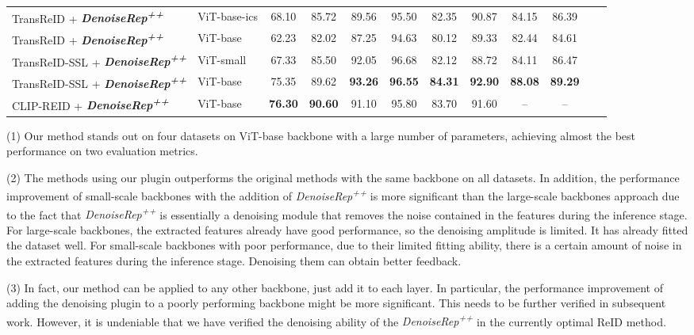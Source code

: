 \documentclass[conference]{IEEEtran}
\begin{document}
{\begin{table}[ht!]
\begin{tabular}{llcccccccccc}
\midrule
TransReID + \textbf{\textit{DenoiseRep\textsuperscript{++}}} & ViT-base-ics        & 68.10  & 85.72   & 89.56   & 95.50  & 82.35  & 90.87 & 84.15 & 86.39 \\ 
TransReID + \textbf{\textit{DenoiseRep\textsuperscript{++}}} & ViT-base        & 62.23  & 82.02   & 87.25   & 94.63  & 80.12  & 89.33 & 82.44 & 84.61  \\
TransReID-SSL + \textbf{\textit{DenoiseRep\textsuperscript{++}}} & ViT-small        &  67.33  & 85.50   & 92.05   & 96.68  & 82.12  & 88.72 & 84.11 & 86.47  \\ 
TransReID-SSL + \textbf{\textit{DenoiseRep\textsuperscript{++}}} & ViT-base        & 75.35  & 89.62   & \textbf{93.26}   & \textbf{96.55}  & \textbf{84.31}  & \textbf{92.90} & \textbf{88.08} & \textbf{89.29}  \\ 
CLIP-REID + \textbf{\textit{DenoiseRep\textsuperscript{++}}} &  ViT-base   & \textbf{76.30}  & \textbf{90.60}  & 91.10 &95.80  & 83.70 &91.60 & -- & --   \\
\hline \hline
\end{tabular}
\end{table}

(1) Our method stands out on four datasets on ViT-base backbone with a large number of parameters, achieving almost the best performance on two evaluation metrics.

(2) The methods using our plugin outperforms the original methods with the same backbone on all datasets. In addition, the performance improvement of small-scale backbones with the addition of \textit{DenoiseRep\textsuperscript{++}} is more significant than the large-scale backbones approach due to the fact that \textit{DenoiseRep\textsuperscript{++}} is essentially a denoising module that removes the noise contained in the features during the inference stage. For large-scale backbones, the extracted features already have good performance, so the denoising amplitude is limited. It has already fitted the dataset well. For small-scale backbones with poor performance, due to their limited fitting ability, there is a certain amount of noise in the extracted features during the inference stage. Denoising them can obtain better feedback.


(3) In fact, our method can be applied to any other backbone, just add it to each layer. In particular, the performance improvement of adding the denoising plugin to a poorly performing backbone might be more significant. This needs to be further verified in subsequent work. However, it is undeniable that we have verified the denoising ability of the \textit{DenoiseRep\textsuperscript{++}} in the currently optimal ReID method.

}
\end{document}
